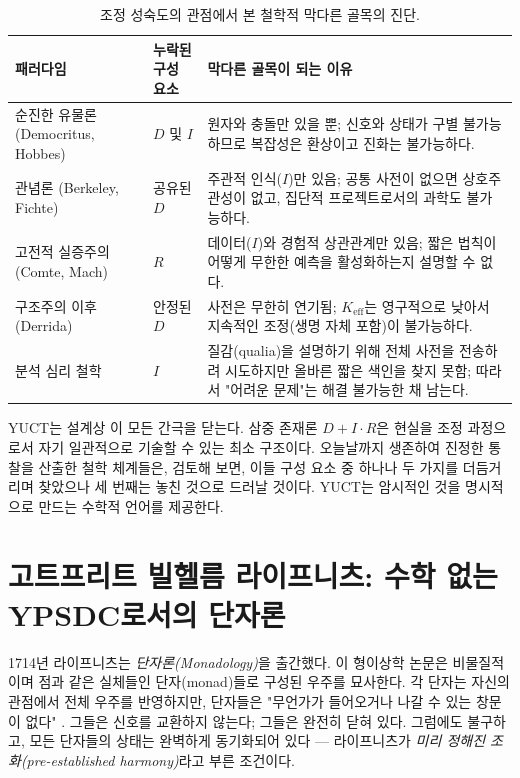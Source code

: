 \documentclass[12pt,a4paper]{article}
\newcommand{\Keff}{K_{\mathrm{eff}}}
\begin{document}
	\begin{table}[htbp]
		\centering
		\caption{조정 성숙도의 관점에서 본 철학적 막다른 골목의 진단.}
		\label{tab:dead-ends}
		\small
		\begin{tabular}{p{3cm} p{5.5cm} p{5.5cm}}
			\toprule
			\textbf{패러다임} & \textbf{누락된 구성 요소} & \textbf{막다른 골목이 되는 이유} \\
			\midrule
			순진한 유물론 (Democritus, Hobbes) & \(D\) 및 \(I\) & 원자와 충돌만 있을 뿐; 신호와 상태가 구별 불가능하므로 복잡성은 환상이고 진화는 불가능하다. \\
			관념론 (Berkeley, Fichte) & 공유된 \(D\) & 주관적 인식(\(I\))만 있음; 공통 사전이 없으면 상호주관성이 없고, 집단적 프로젝트로서의 과학도 불가능하다. \\
			고전적 실증주의 (Comte, Mach) & \(R\) & 데이터(\(I\))와 경험적 상관관계만 있음; 짧은 법칙이 어떻게 무한한 예측을 활성화하는지 설명할 수 없다. \\
			구조주의 이후 (Derrida) & 안정된 \(D\) & 사전은 무한히 연기됨; \(\Keff\)는 영구적으로 낮아서 지속적인 조정(생명 자체 포함)이 불가능하다. \\
			분석 심리 철학 & \(I\) & 질감(qualia)을 설명하기 위해 전체 사전을 전송하려 시도하지만 올바른 짧은 색인을 찾지 못함; 따라서 "어려운 문제"는 해결 불가능한 채 남는다. \\
			\bottomrule
		\end{tabular}
	\end{table}
	
	YUCT는 설계상 이 모든 간극을 닫는다. 삼중 존재론 \(D + I \cdot R\)은 현실을 조정 과정으로서 자기 일관적으로 기술할 수 있는 최소 구조이다. 오늘날까지 생존하여 진정한 통찰을 산출한 철학 체계들은, 검토해 보면, 이들 구성 요소 중 하나나 두 가지를 더듬거리며 찾았으나 세 번째는 놓친 것으로 드러날 것이다. YUCT는 암시적인 것을 명시적으로 만드는 수학적 언어를 제공한다.
	
	\section{고트프리트 빌헬름 라이프니츠: 수학 없는 YPSDC로서의 단자론}
	
	1714년 라이프니츠는 \emph{단자론(Monadology)}을 출간했다. 이 형이상학 논문은 비물질적이며 점과 같은 실체들인 단자(monad)들로 구성된 우주를 묘사한다. 각 단자는 자신의 관점에서 전체 우주를 반영하지만, 단자들은 "무언가가 들어오거나 나갈 수 있는 창문이 없다" \cite{Leibniz1714}. 그들은 신호를 교환하지 않는다; 그들은 완전히 닫혀 있다. 그럼에도 불구하고, 모든 단자들의 상태는 완벽하게 동기화되어 있다 --- 라이프니츠가 \emph{미리 정해진 조화(pre-established harmony)}라고 부른 조건이다.
	
\end{document}
